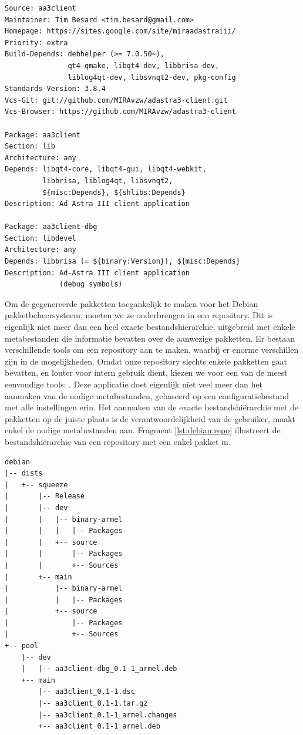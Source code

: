 \begin{lstlisting}[float, caption=Debian control packaging bestand., label=lst:debian:rules]
Source: aa3client
Maintainer: Tim Besard <tim.besard@gmail.com>
Homepage: https://sites.google.com/site/miraadastraiii/
Priority: extra
Build-Depends: debhelper (>= 7.0.50~),
               qt4-qmake, libqt4-dev, libbrisa-dev,
               liblog4qt-dev, libsvnqt2-dev, pkg-config
Standards-Version: 3.8.4
Vcs-Git: git://github.com/MIRAvzw/adastra3-client.git
Vcs-Browser: https://github.com/MIRAvzw/adastra3-client

Package: aa3client
Section: lib
Architecture: any
Depends: libqt4-core, libqt4-gui, libqt4-webkit,
         libbrisa, liblog4qt, libsvnqt2,
         ${misc:Depends}, ${shlibs:Depends}
Description: Ad-Astra III client application

Package: aa3client-dbg
Section: libdevel
Architecture: any
Depends: libbrisa (= ${binary:Version}), ${misc:Depends}
Description: Ad-Astra III client application
             (debug symbols)
\end{lstlisting}

Om de gegenereerde pakketten toegankelijk te maken voor het Debian pakketbeheersysteem, moeten we ze onderbrengen in een repository. Dit is eigenlijk niet meer dan een heel exacte bestandshiërarchie, uitgebreid met enkele metabestanden die informatie bevatten over de aanwezige pakketten. Er bestaan verschillende tools om een repository aan te maken, waarbij er enorme verschillen zijn in de mogelijkheden. Omdat onze repository slechts enkele pakketten gaat bevatten, en louter voor intern gebruik dient, kiezen we voor een van de meest eenvoudige tools: . Deze applicatie doet eigenlijk niet veel meer dan het aanmaken van de nodige metabestanden, gebaseerd op een configuratiebestand met alle instellingen erin. Het aanmaken van de exacte bestandshiërarchie met de pakketten op de juiste plaats is de verantwoordelijkheid van de gebruiker,  maakt enkel de nodige metabestanden aan. Fragment \ref{lst:debian:repo} illustreert de bestandshiërarchie van een repository met een enkel pakket in.

\begin{lstlisting}[float, caption=Bestandshiërarchie in een Debian repository., label=lst:debian:repo]
debian
|-- dists
|   +-- squeeze
|       |-- Release
|       |-- dev
|       |   |-- binary-armel
|       |   |   |-- Packages
|       |   +-- source
|       |       |-- Packages
|       |       +-- Sources
|       +-- main
|           |-- binary-armel
|           |   |-- Packages
|           +-- source
|               |-- Packages
|               +-- Sources
+-- pool
    |-- dev
    |   |-- aa3client-dbg_0.1-1_armel.deb
    +-- main
        |-- aa3client_0.1-1.dsc
        |-- aa3client_0.1-1.tar.gz
        |-- aa3client_0.1-1_armel.changes
        +-- aa3client_0.1-1_armel.deb
\end{lstlisting}

